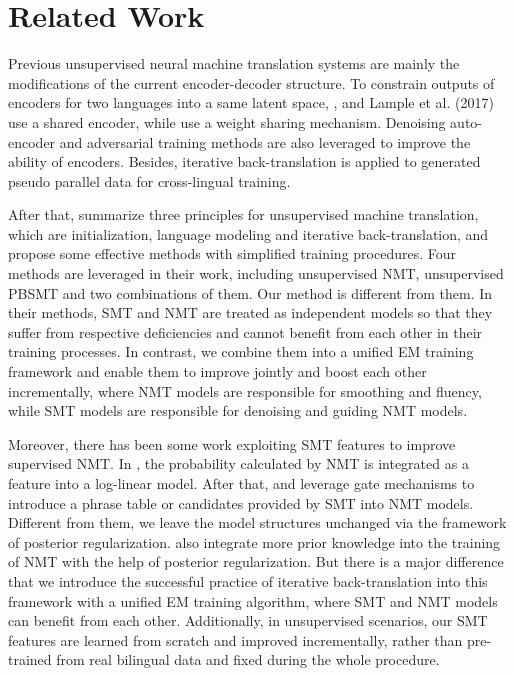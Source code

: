 \documentclass[letterpaper]{article} \usepackage{aaai19}  \usepackage{times}  \usepackage{helvet}  \usepackage{courier}  \usepackage{url}  \usepackage{graphicx}  \usepackage{amsmath}
\begin{document}
\section{Related Work}

Previous unsupervised neural machine translation systems \cite{artetxe2017unsupervised,lample2017unsupervised,yang2018unsupervised} are mainly the modifications of the current encoder-decoder structure. To constrain outputs of encoders for two languages into a same latent space, \citeauthor{artetxe2017unsupervised} , and Lample et al. (2017) use a shared encoder, while \citeauthor{yang2018unsupervised}  use a weight sharing mechanism. Denoising auto-encoder \cite{vincent2010stacked} and adversarial training methods are also leveraged to improve the ability of encoders. Besides, iterative back-translation is applied to generated pseudo parallel data for cross-lingual training.

After that, \citeauthor{lample2018phrase}  summarize three principles for unsupervised machine translation, which are initialization, language modeling and iterative back-translation, and propose some effective methods with simplified training procedures. Four methods are leveraged in their work, including unsupervised NMT, unsupervised PBSMT and two combinations of them. Our method is different from them. In their methods, SMT and NMT are treated as independent models so that they suffer from respective deficiencies and cannot benefit from each other in their training processes. In contrast, we combine them into a unified EM training framework and enable them to improve jointly and boost each other incrementally, where NMT models are responsible for smoothing and fluency, while SMT models are responsible for denoising and guiding NMT models.

Moreover, there has been some work exploiting SMT features to improve supervised NMT. In \citeauthor{he2016improved} , the probability calculated by NMT is integrated as a feature into a log-linear model. After that, \citeauthor{tang2016neural}  and \citeauthor{wang2017neural}  leverage gate mechanisms to introduce a phrase table or candidates provided by SMT into NMT models. Different from them, we leave the model structures unchanged via the framework of posterior regularization. \citeauthor{zhang2017prior}  also integrate more prior knowledge into the training of NMT with the help of posterior regularization. But there is a major difference that we introduce the successful practice of iterative back-translation into this framework with a unified EM training algorithm, where SMT and NMT models can benefit from each other. Additionally, in unsupervised scenarios, our SMT features are learned from scratch and improved incrementally, rather than pre-trained from real bilingual data and fixed during the whole procedure.
\end{document}
